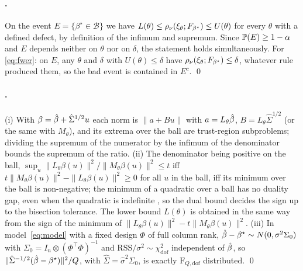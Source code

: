 \paragraph{.} On the event $E = \{\beta^\star \in
\mathcal B\}$ we have $L(\theta) \le \rho_\nu(\xi_\theta;F_{\beta^\star}) \le
U(\theta)$ for every $\theta$ with a defined defect, by definition of the
infimum and supremum. Since $\mathbb{P}(E) \ge 1-\alpha$ and $E$ depends neither on
$\theta$ nor on $\delta$, the statement holds simultaneously. For
\eqref{eq:fwer}: on $E$, any $\theta$ and $\delta$ with $U(\theta) \le \delta$
have $\rho_\nu(\xi_\theta;F_{\beta^\star}) \le \delta$, whatever rule
produced them, so the bad event is contained in $E^c$. \qed

\paragraph{.} (i) With $\beta = \hat{\beta} + \hat\Sigma^{1/2}u$
each norm is $\|a + Bu\|$ with $a = L_\theta\hat{\beta}$, $B =
L_\theta\hat\Sigma^{1/2}$ (or the same with $M_\theta$), and its extrema over
the ball are trust-region subproblems; dividing the supremum of the numerator
by the infimum of the denominator bounds the supremum of the ratio. (ii) The
denominator being positive on the ball, $\sup_u
\|L_\theta\beta(u)\|^2/\|M_\theta\beta(u)\|^2 \le t$ iff
$t\|M_\theta\beta(u)\|^2 - \|L_\theta\beta(u)\|^2 \ge 0$ for all $u$ in the
ball, iff its minimum over the ball is non-negative; the minimum of a
quadratic over a ball has no duality gap, even when the quadratic is
indefinite \citep{more1983computing,conn2000trust}, so the dual bound decides
the sign up to the bisection tolerance. The lower bound $L(\theta)$ is obtained
in the same way from the sign of the minimum of $\|L_\theta\beta(u)\|^2 -
t\|M_\theta\beta(u)\|^2$. (iii) In model~\eqref{eq:model} with a fixed design
$\Phi$ of full column rank, $\hat{\beta} -
\beta^\star \sim N(0, \sigma^2 \Sigma_0)$ with $\Sigma_0 = I_n \otimes
(\Phi^{\!\top}\Phi)^{-1}$ and $\mathrm{RSS}/\sigma^2 \sim
\chi^2_{\mathrm{dof}}$ independent of $\hat{\beta}$, so
$\|\hat\Sigma^{-1/2}(\hat{\beta}-\beta^\star)\|^2/Q$, with $\hat\Sigma =
\hat\sigma^2\Sigma_0$, is exactly $\mathrm{F}_{Q,\mathrm{dof}}$ distributed. \qed

